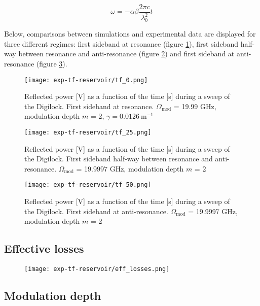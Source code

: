 \begin{equation}
	\omega = - \alpha \beta \frac{2 \pi c}{\lambda_0^2} t
\end{equation}

Below, comparisons between simulations and experimental data are displayed for three different regimes: first sideband at resonance (figure \ref{tf_0}), first sideband half-way between resonance and anti-resonance (figure \ref{tf_25}) and first sideband at anti-resonance (figure \ref{tf_50}).

\begin{figure}[h]
	\centering
	\texttt{[image: exp-tf-reservoir/tf\_0.png]}
	\caption{Reflected power [V] as a function of the time [s] during a sweep of the Digilock. First sideband at resonance. $\Omega_{\text{mod}}$ = 19.99 GHz, modulation depth $m$ = 2, $\gamma = 0.0126~\text{m}^{-1}$}
	\label{tf_0}
\end{figure}

\begin{figure}[h]
	\centering
	\texttt{[image: exp-tf-reservoir/tf\_25.png]}
	\caption{Reflected power [V] as a function of the time [s] during a sweep of the Digilock. First sideband half-way between resonance and anti-resonance. $\Omega_{\text{mod}}$ = 19.9997 GHz, modulation depth $m$ = 2}
	\label{tf_25}
\end{figure}

\begin{figure}[h]
	\centering
	\texttt{[image: exp-tf-reservoir/tf\_50.png]}
	\caption{Reflected power [V] as a function of the time [s] during a sweep of the Digilock. First sideband at anti-resonance. $\Omega_{\text{mod}}$ = 19.9997 GHz, modulation depth $m$ = 2}
	\label{tf_50}
\end{figure}


\subsection{Effective losses}

\begin{figure}
	\centering
	\texttt{[image: exp-tf-reservoir/eff\_losses.png]}
\end{figure}


\subsection{Modulation depth}

